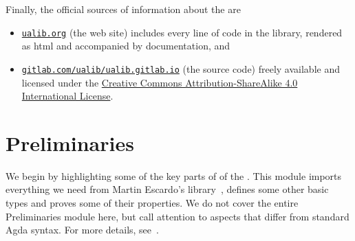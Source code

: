 \documentclass[a4paper,UKenglish,cleveref,autoref,thm-restate]{lipics-v2021}
\begin{document}
Finally, the official sources of information about the \agdaualib are
\begin{itemize}
  \item \href{https://ualib.gitlab.io}{\texttt{ualib.org}} (the web site) includes every line of code in the library, rendered as html and accompanied by documentation, and
  \item \href{https://gitlab.com/ualib/ualib.gitlab.io}{\texttt{gitlab.com/ualib/ualib.gitlab.io}} (the source code) freely available and licensed under the \href{https://creativecommons.org/licenses/by-sa/4.0/}{Creative Commons Attribution-ShareAlike 4.0 International License}.
\end{itemize}















\section{Preliminaries}\label{sec:preliminaries}
We begin by highlighting some of the key parts of \ualibPreliminaries of the \agdaualib. This module imports everything we need from Martin Escardo's \typetopology library~\cite{MHE}, defines some other basic types and proves some of their properties.  We do not cover the entire Preliminaries module here, but call attention to aspects that differ from standard Agda syntax. For more details, see~\cite[\S2]{DeMeo:2021}.
\end{document}
